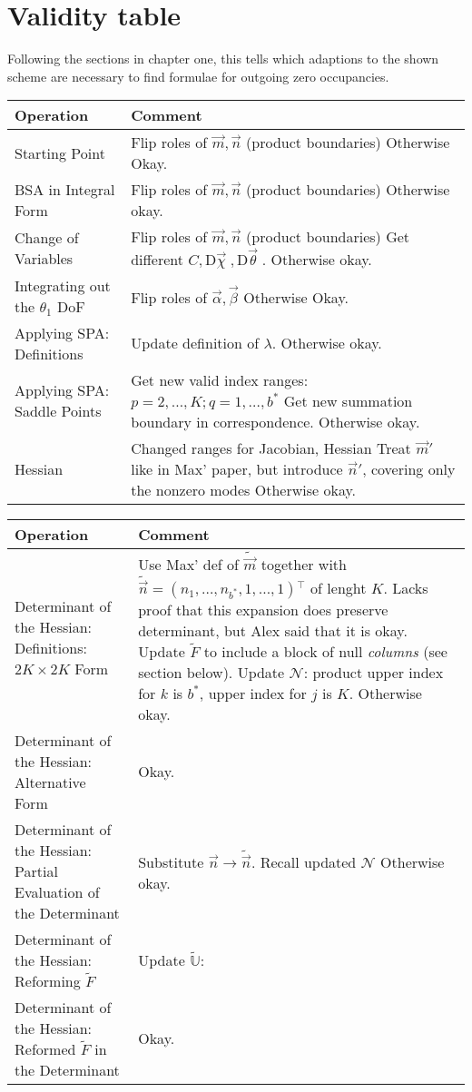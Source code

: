 \documentclass[
	english,
	a4paper,
	fontsize=10pt,
	parskip=half,
	titlepage=true,
	DIV=12,
	final
]{scrreprt}
\newcommand*{\tabcrlf}{\\ \hline}			%
\newcommand*{\transp}{\ensuremath{^\intercal}}
\newcommand*{\DD}[1]{\ensuremath{\text{D}\vec{#1}\;}}
\begin{document}
\section{Validity table}
Following the sections in chapter one, this tells which adaptions to the shown scheme are necessary to find formulae for outgoing zero occupancies.

\begin{tabularx}
	{\linewidth}
	{p{.30\linewidth}
	 p{.65\linewidth}}
	\textbf{Operation} & \textbf{Comment} \tabcrlf
	
	Starting Point &
		Flip roles of $\vec{m}, \vec{n}$ (product boundaries) \newline
		Otherwise Okay.
	\tabcrlf
	BSA in Integral Form &
		Flip roles of $\vec{m}, \vec{n}$ (product boundaries) \newline
		Otherwise okay.
	\tabcrlf
	Change of Variables &
		Flip roles of $\vec{m}, \vec{n}$ (product boundaries) \newline
		Get different $C, \DD{\chi}, \DD{\theta}$.\newline
		Otherwise okay.
	\tabcrlf
	Integrating out the $\theta_1$ DoF &
		Flip roles of $\vec{\alpha}, \vec{\beta}$ \newline
		Otherwise Okay.
	\tabcrlf
	Applying SPA: Definitions &
		Update definition of $\lambda$. \newline
		Otherwise okay.
	\tabcrlf
	Applying SPA: Saddle Points &
		Get new valid index ranges: $p = 2, \ldots, K; q = 1, \ldots, b^*$ \newline
		Get new summation boundary in correspondence. \newline
		Otherwise okay.
	\tabcrlf
	Hessian &
		Changed ranges for Jacobian, Hessian \newline
		Treat $\vec{m}'$ like in Max' paper, but introduce $\vec{n}'$, covering only the nonzero modes
		Otherwise okay.
	\tabcrlf
\end{tabularx}

\begin{tabularx}
	{\linewidth}
	{p{.30\linewidth}
	 p{.65\linewidth}}
	\textbf{Operation} & \textbf{Comment} \tabcrlf
	
	Determinant of the Hessian: Definitions: $2K \times 2K$ Form &
		Use Max' def of $\tilde{\vec{m}}$ together with 
		$\tilde{\vec{n}} = (n_1, \ldots, n_{b^*}, 1, \ldots, 1)\transp$ of lenght $K$. Lacks proof that
		this expansion does preserve determinant, but Alex said that it is okay.\newline
		Update $\tilde{F}$ to include a block of null \emph{columns} (see section below).
		Update $\mathcal{N}$: product upper index for $k$ is $b^*$, upper index for $j$ is $K$.
		Otherwise okay.
	\tabcrlf
	Determinant of the Hessian: Alternative Form &
		Okay.
	\tabcrlf
	Determinant of the Hessian: Partial Evaluation of the Determinant &
		Substitute $\vec{n} \to \tilde{\vec{n}}$. Recall updated $\mathcal{N}$ \newline
		Otherwise okay.
	\tabcrlf
	Determinant of the Hessian: Reforming $\tilde{F}$ &
		Update $\tilde{\mathbb{U}}$:
	\tabcrlf
	Determinant of the Hessian: Reformed $\tilde{F}$ in the Determinant &
		Okay.
\end{tabularx}
\end{document}
